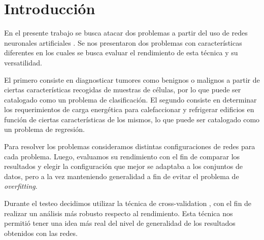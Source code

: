 \documentclass[informe.tex]{subfiles}
\begin{document}
  
  \section{Introducción}

  En el presente trabajo se busca atacar dos problemas a partir del uso de redes neuronales artificiales \cite{hertz}. Se nos presentaron dos problemas con características diferentes en los cuales se busca evaluar el rendimiento de esta técnica y su versatilidad. 
  
  El primero consiste en diagnosticar tumores como benignos o malignos a partir de ciertas características recogidas de muestras de células, por lo que puede ser catalogado como un problema de clasificación. El segundo consiste en determinar los requerimientos de carga energética para calefaccionar y refrigerar edificios en función de ciertas características de los mismos, lo que puede ser catalogado como un problema de regresión.
  
  Para resolver los problemas consideramos distintas configuraciones de redes para cada problema. Luego, evaluamos su rendimiento con el fin de comparar los resultados y elegir la configuración que mejor se adaptaba a los conjuntos de datos, pero a la vez manteniendo generalidad a fin de evitar el problema de \emph{overfitting}.
  
  Durante el testeo decidimos utilizar la técnica de cross-validation \cite{haykin}, con el fin de realizar un análisis más robusto respecto al rendimiento. Esta técnica nos permitió tener una idea más real del nivel de generalidad de los resultados obtenidos con las redes.
  
\end{document}

